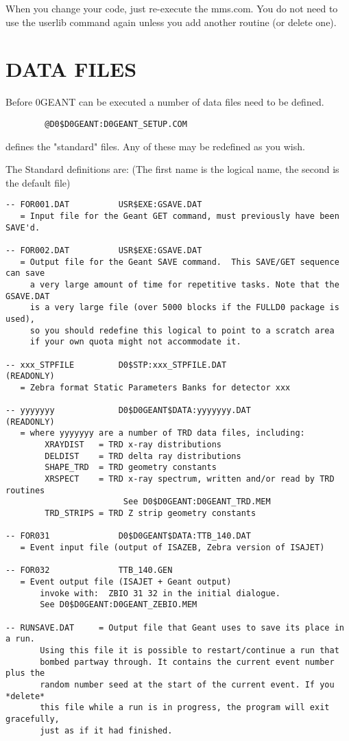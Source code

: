 When you change your code, just re-execute the mms.com.  You do not need
to use the userlib command again unless you add another routine (or delete
one).

\section{DATA FILES}
\label{files}

Before \D0GEANT can be executed a number of data files need to be defined.

\begin{verbatim}
        @D0$D0GEANT:D0GEANT_SETUP.COM
\end{verbatim}

defines the "standard" files. Any of these may be redefined as you wish.

The Standard definitions are: (The first name is the logical name, the second
is the default file)

\begin{verbatim}
-- FOR001.DAT          USR$EXE:GSAVE.DAT
   = Input file for the Geant GET command, must previously have been SAVE'd.

-- FOR002.DAT          USR$EXE:GSAVE.DAT
   = Output file for the Geant SAVE command.  This SAVE/GET sequence can save
     a very large amount of time for repetitive tasks. Note that the GSAVE.DAT
     is a very large file (over 5000 blocks if the FULLD0 package is used),
     so you should redefine this logical to point to a scratch area
     if your own quota might not accommodate it.

-- xxx_STPFILE         D0$STP:xxx_STPFILE.DAT                  (READONLY)
   = Zebra format Static Parameters Banks for detector xxx

-- yyyyyyy             D0$D0GEANT$DATA:yyyyyyy.DAT             (READONLY)
   = where yyyyyyy are a number of TRD data files, including:
        XRAYDIST   = TRD x-ray distributions
        DELDIST    = TRD delta ray distributions
        SHAPE_TRD  = TRD geometry constants
        XRSPECT    = TRD x-ray spectrum, written and/or read by TRD routines
                        See D0$D0GEANT:D0GEANT_TRD.MEM
        TRD_STRIPS = TRD Z strip geometry constants

-- FOR031              D0$D0GEANT$DATA:TTB_140.DAT
   = Event input file (output of ISAZEB, Zebra version of ISAJET)

-- FOR032              TTB_140.GEN
   = Event output file (ISAJET + Geant output)
       invoke with:  ZBIO 31 32 in the initial dialogue.
       See D0$D0GEANT:D0GEANT_ZEBIO.MEM

-- RUNSAVE.DAT     = Output file that Geant uses to save its place in a run.
       Using this file it is possible to restart/continue a run that
       bombed partway through. It contains the current event number plus the
       random number seed at the start of the current event. If you *delete*
       this file while a run is in progress, the program will exit gracefully,
       just as if it had finished.
\end{verbatim}

